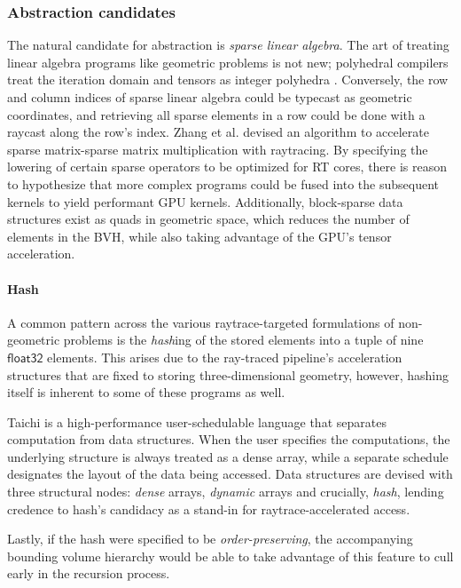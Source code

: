 \documentclass[review, acmsmall, nonacm]{acmart}
\begin{document}
\subsubsection{Abstraction candidates} The natural candidate for abstraction is \emph{sparse linear algebra}. The art of treating linear algebra programs like geometric problems is not new; polyhedral compilers treat the iteration domain and tensors as integer polyhedra \cite{grosserPolyhedralASTGeneration2015}. Conversely, the row and column indices of sparse linear algebra could be typecast as geometric coordinates, and retrieving all sparse elements in a row could be done with a raycast along the row's index. Zhang et al. \cite{zhangRTSpMSpMHarnessingRay2025} devised an algorithm to accelerate sparse matrix-sparse matrix multiplication with raytracing. By specifying the lowering of certain sparse operators to be optimized for RT cores, there is reason to hypothesize that more complex programs could be fused into the subsequent kernels to yield performant GPU kernels. Additionally, block-sparse data structures exist as quads in geometric space, which reduces the number of elements in the BVH, while also taking advantage of the GPU's tensor acceleration.

\paragraph{Hash} A common pattern across the various raytrace-targeted formulations of non-geometric problems is the \emph{hash}ing of the stored elements into a tuple of nine $\mathsf{float32}$ elements. This arises due to the ray-traced pipeline's acceleration structures that are fixed to storing three-dimensional geometry, however, hashing itself is inherent to some of these programs as well.

Taichi \cite{huTaichiLanguageHighperformance2019} is a high-performance user-schedulable language that separates computation from data structures. When the user specifies the computations, the underlying structure is always treated as a dense array, while a separate schedule designates the layout of the data being accessed. Data structures are devised with three structural nodes: \emph{dense} arrays, \emph{dynamic} arrays and crucially, \emph{hash}, lending credence to hash's candidacy as a stand-in for raytrace-accelerated access.

Lastly, if the hash were specified to be \emph{order-preserving}, the accompanying bounding volume hierarchy would be able to take advantage of this feature to cull early in the recursion process.
\end{document}
